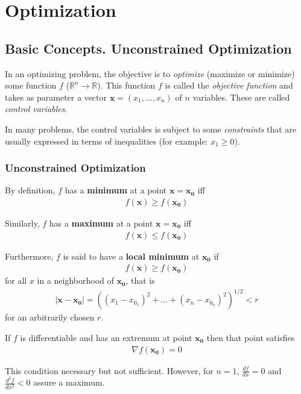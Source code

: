\chapter{Optimization}
\section{Basic Concepts. Unconstrained Optimization}
In an optimizing problem, the objective is to \emph{optimize} (maximize or minimize) some function $f$ ($\mathbb R^n\rightarrow \mathbb R$). This function $f$ is called the \emph{objective function} and takes as parameter a vector $\mathbf{x}=(x_1,\dots,x_n)$ of $n$ variables. These are called \emph{control variables}.

In many problems, the control variables is subject to some \emph{constraints} that are usually expressed in terms of inequalities (for example: $x_1\geq0$).

\subsection{Unconstrained Optimization}

By definition, $f$ has a \textbf{minimum} at a point $\mathbf{x}=\mathbf{x_0}$ iff
\begin{eqnarray}
	f(\mathbf{x})\geq f(\mathbf{x_0})
\end{eqnarray}

Similarly, $f$ has a \textbf{maximum} at a point $\mathbf{x}=\mathbf{x_0}$ iff
\begin{eqnarray}
	f(\mathbf{x})\leq f(\mathbf{x_0})
\end{eqnarray}

Furthermore, $f$ is said to have a \textbf{local minimum} at $\mathbf{x_0}$ if 
\begin{eqnarray}
	f(\mathbf{x})\geq f(\mathbf{x_0})
\end{eqnarray}
for all $x$ in a neighborhood of $\mathbf{x_0}$, that is
\begin{eqnarray}
	|\mathbf{x}-\mathbf{x_0}|=\left((x_1-x_{0_1})^2+\dots+(x_n-x_{0_n})^2\right)^{1/2}<r
\end{eqnarray}
for an  arbitrarily chosen $r$.

If $f$ is differentiable and has an extremum at point $\mathbf{x_0}$ then that point satisfies
\begin{eqnarray}
	\nabla f(\mathbf{x_0})=0
\end{eqnarray}

This condition necessary but not sufficient. However, for $n=1$, $\frac{df}{dx}=0$ and $\frac{d^2f}{dx^2}<0$ assure a maximum.

